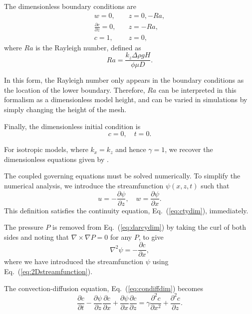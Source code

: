 \documentclass[11pt, a4paper]{csiroreport2012}
\begin{document}
The dimensionless boundary conditions are
\begin{align}
w = 0,&  \quad z = 0, -Ra, \label{eq:dimbc1} \\
\frac{\partial c}{\partial z} = 0,& \quad z = -Ra, \label{eq:dimbc2}\\
c = 1,& \quad z = 0, \label{eq:dimbc3}
\end{align}
where $Ra$ is the Rayleigh number, defined as
\begin{equation}
Ra = \frac{k_z \Delta \rho g H}{\phi \mu D}.
\label{eq:ra}
\end{equation}

In this form, the Rayleigh number only appears in the boundary conditions as the location of the lower boundary. Therefore, $Ra$ can be interpreted in this formalism as a dimensionless model height, and can be varied in simulations by simply changing the height of the mesh.

Finally, the dimensionless initial condition is
\begin{equation}
c = 0, \quad t = 0.
\label{eq:ic}
\end{equation}

For isotropic models, where $k_x = k_z$ and hence $\gamma = 1$, we recover the dimensionless equations given by \cite{Slim2014}.

The coupled governing equations must be solved numerically. To simplify the numerical analysis, we introduce the streamfunction $\psi(x,z,t)$ such that
\begin{equation}
u = - \frac{\partial \psi}{\partial z}, \quad w = \frac{\partial \psi}{\partial x}.
\label{eq:2Dstreamfunction}
\end{equation}
This definition satisfies the continuity equation, Eq.~(\ref{eq:ctydim}), immediately.

The pressure $P$ is removed from Eq.~(\ref{eq:darcydim}) by taking the curl of both sides and noting that $\nabla \times \nabla P = 0 $ for any $P$, to give
\begin{equation}
\nabla^2 \psi = - \frac{\partial c}{\partial x},
\label{eq:darcypsi}
\end{equation}
where we have introduced the streamfunction $\psi$ using Eq.~(\ref{eq:2Dstreamfunction}).

The convection-diffusion equation, Eq.~(\ref{eq:condiffdim}) becomes
\begin{equation}\frac{\partial c}{\partial t} - \frac{\partial \psi}{\partial z} \frac{\partial c}{\partial x} + \frac{\partial \psi}{\partial x} \frac{\partial c}{\partial z} = \gamma \frac{\partial^2 c}{\partial x^2} + \frac{\partial^2 c}{\partial z}.
\label{eq:condiffpsi}
\end{equation}
\end{document}
